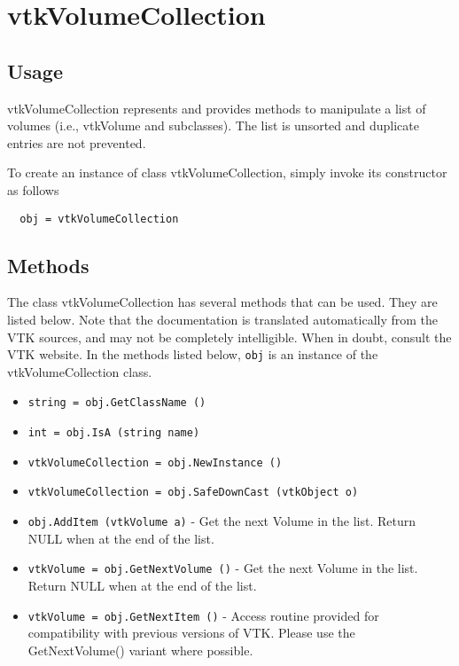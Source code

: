 \section{vtkVolumeCollection}

\subsection{Usage}

 vtkVolumeCollection represents and provides methods to manipulate a 
 list of volumes (i.e., vtkVolume and subclasses). The list is unsorted 
 and duplicate entries are not prevented.

To create an instance of class vtkVolumeCollection, simply
invoke its constructor as follows
\begin{verbatim}
  obj = vtkVolumeCollection
\end{verbatim}
\subsection{Methods}

The class vtkVolumeCollection has several methods that can be used.
  They are listed below.
Note that the documentation is translated automatically from the VTK sources,
and may not be completely intelligible.  When in doubt, consult the VTK website.
In the methods listed below, \verb|obj| is an instance of the vtkVolumeCollection class.
\begin{itemize}
\item  \verb|string = obj.GetClassName ()|

\item  \verb|int = obj.IsA (string name)|

\item  \verb|vtkVolumeCollection = obj.NewInstance ()|

\item  \verb|vtkVolumeCollection = obj.SafeDownCast (vtkObject o)|

\item  \verb|obj.AddItem (vtkVolume a)| -  Get the next Volume in the list. Return NULL when at the end of the 
 list.

\item  \verb|vtkVolume = obj.GetNextVolume ()| -  Get the next Volume in the list. Return NULL when at the end of the 
 list.

\item  \verb|vtkVolume = obj.GetNextItem ()| -  Access routine provided for compatibility with previous
 versions of VTK.  Please use the GetNextVolume() variant
 where possible.

\end{itemize}
